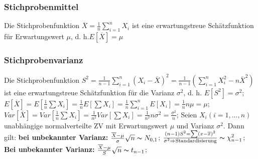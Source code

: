 \subsubsection{Stichprobenmittel}
Die Stichprobenfunktion $ \overline{X} = \frac{1}{n} \sum_{i=1}^{n} X_{i} $ ist eine erwartungstreue Schätzfunktion für Erwartungswert $ \mu $, d. h.$E[\overline{X}] = \mu$
\subsubsection{Stichprobenvarianz}
Die Stichprobenfunktion $ S^2 = \frac{1}{n-1} \sum_{i=1}^{n} (X_{i} - \overline{X})^2 = \frac{1}{n-1}(\sum_{i=1}^{n}X_{i}^2 - n\overline{X}^2)$ist eine erwartungstreue Schätzfunktion für die Varianz $\sigma^2$, d. h. $E[S^2] =\sigma^2$; 
$ E[\overline{X}] = E[\frac{1}{n}\sum X_{i}] = \frac{1}{n} E[\sum X_{i}] = \frac{1}{n} \sum_{i=1}^{n} E[X_{i}] = \frac{1}{n} n\mu = \mu$; 
$ Var[\overline{X}] = Var[\frac{1}{n}\sum X_{i}] = \frac{1}{n^2} Var[\sum X_{i}] = \frac{1}{n^2}n\sigma^2 = \frac{\sigma^2}{n} $; 
Seien $ X_{i} (i=1, ..., n)$ unabhängige normalverteilte ZV mit Erwartungswert $\mu$ und Varianz $\sigma^2$. Dann gilt:
\textbf{bei unbekannter Varianz:} $ \frac{\overline{X} -\mu}{\sigma} \sqrt{n} \thicksim N_{0,1}$; 
$ \frac{(n-1)S^2 = \sum(x-\overline{x})^2}{\sigma^2 \Rightarrow \text{Standardisierung}} \thicksim \chi_{n-1}^{2}$; 
\textbf{Bei unbekannter Varianz:} $ \frac{\overline{X}-\mu}{S}\sqrt{n} \thicksim t_{n-1}$; 